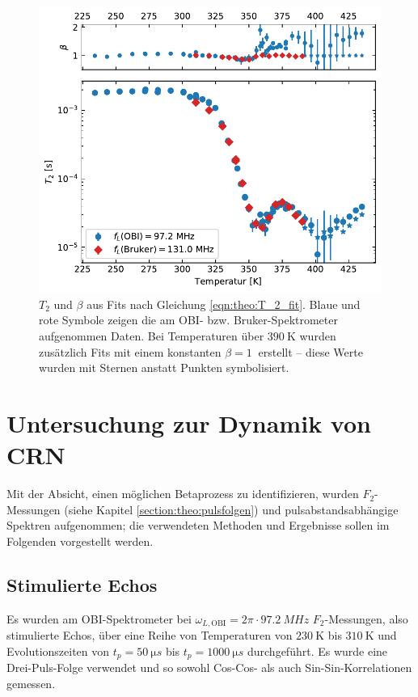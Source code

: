 \begin{figure}
	\begin{center}
		\includegraphics[width=.9\textwidth]{graphics/plot/t2.pdf}
	\end{center}
	\caption{$T_2$ und $\beta$ aus Fits nach Gleichung \eqref{eqn:theo:T_2_fit}. Blaue und rote Symbole zeigen die am OBI- bzw. Bruker-Spektrometer aufgenommen Daten. Bei Temperaturen über $\SI{390}{\kelvin}$ wurden zusätzlich Fits mit einem konstanten $\beta = \SI{1}{}$ erstellt -- diese Werte wurden mit Sternen anstatt Punkten symbolisiert.} \label{fig:res:T_2}
\end{figure}



\section{Untersuchung zur Dynamik von CRN} \label{section:res:F_2}

Mit der Absicht, einen möglichen Betaprozess zu identifizieren, wurden $F_2$-Messungen (siehe Kapitel \ref{section:theo:pulsfolgen}) und pulsabstandsabhängige Spektren aufgenommen; die verwendeten Methoden und Ergebnisse sollen im Folgenden vorgestellt werden.

\subsection{Stimulierte Echos} \label{section:res:stimechos}

Es wurden am OBI-Spektrometer bei $\omega_{L, \text{OBI}} = 2\pi \cdot \SI{97.2}{MHz}$ $F_2$-Messungen, also stimulierte Echos, über eine Reihe von Temperaturen von $\SI{230}{\kelvin}$ bis $\SI{310}{\kelvin}$ und Evolutionszeiten von $t_p = \SI{50}{\micro s}$ bis $t_p = \SI{1000}{\micro s}$ durchgeführt. Es wurde eine Drei-Puls-Folge verwendet und so sowohl Cos-Cos- als auch Sin-Sin-Korrelationen gemessen.

